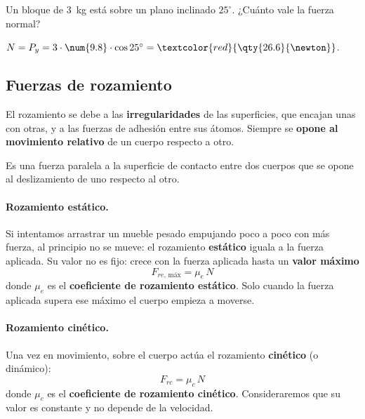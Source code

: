 \begin{exercise}
    Un bloque de \qty{3}{\kg} está sobre un plano inclinado \(25^\circ\). ¿Cuánto vale la fuerza normal?
    \begin{solu}
        \(N = P_y = 3 \cdot \num{9.8} \cdot \cos 25^\circ = \textcolor{red}{\qty{26.6}{\newton}}\).
    \end{solu}
\end{exercise}

\subsection{Fuerzas de rozamiento}

El rozamiento se debe a las \textbf{irregularidades} de las superficies, que encajan unas con otras, y a las fuerzas de adhesión entre
sus átomos. Siempre se \textbf{opone al movimiento relativo} de un cuerpo respecto a otro.

\begin{definition}
    Es una fuerza paralela a la superficie de contacto entre dos cuerpos que se opone al deslizamiento de uno respecto al otro.
\end{definition}

\paragraph{Rozamiento estático.} Si intentamos arrastrar un mueble pesado empujando poco a poco con más fuerza, al principio no se
mueve: el rozamiento \textbf{estático} iguala a la fuerza aplicada. Su valor no es fijo: crece con la fuerza aplicada hasta un
\textbf{valor máximo}
\[ F_{re,\,\text{máx}} = \mu_e\,N \]
donde \(\mu_e\) es el \textbf{coeficiente de rozamiento estático}. Solo cuando la fuerza aplicada supera ese máximo el cuerpo empieza
a moverse.

\paragraph{Rozamiento cinético.} Una vez en movimiento, sobre el cuerpo actúa el rozamiento \textbf{cinético} (o dinámico):
\[ F_{rc} = \mu_c\,N \]
donde \(\mu_c\) es el \textbf{coeficiente de rozamiento cinético}. Consideraremos que su valor es constante y no depende de la velocidad.

